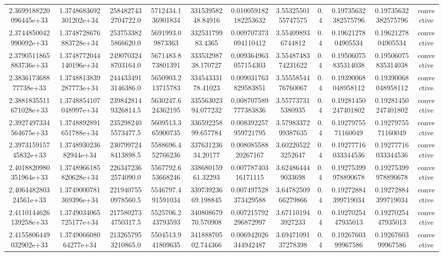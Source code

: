 \begin{table}
\begin{tabular}{ccccccccccc}
2.3699188220096445e+33 & 1.3748683692301202e+34 & 2584827432704722.0 & 5712434.136901834 & 33153958248.84916 & 0.010059182182253632 & 3.5532550155747575 & 0.4 & 0.19735632382575796 & 0.19735632382575796 & convective \\
2.3744850042990092e+33 & 1.3748728676883728e+34 & 2537533825866620.0 & 5691993.09873363 & 33253179983.4365 & 0.009707373094110412 & 3.554098936744812 & 0.4 & 0.1962127804905534 & 0.1962127804905534 & convective \\
2.3790511865883736e+33 & 1.3748772044140196e+34 & 2490703248703164.0 & 5671483.873801391 & 33353298738.170727 & 0.009364963057154303 & 3.5548748374231622 & 0.4 & 0.19506075835314038 & 0.19506075835314038 & convective \\
2.383617368877738e+33 & 1.3748813839287773e+34 & 2444334913146386.0 & 5650903.213715783 & 33454333178.41023 & 0.009031763829583851 & 3.5555854476760067 & 0.4 & 0.19390068048958112 & 0.19390068048958112 & convective \\
2.3881835511671028e+33 & 1.3748854107048997e+34 & 2398428149326814.5 & 5630247.624362195 & 33556302394.077232 & 0.008707589777383836 & 3.557737315380935 & 0.4 & 0.19281450247401802 & 0.19281450247401802 & convective \\
2.3927497334564675e+33 & 1.3748892891651788e+34 & 2352982405573477.5 & 5609513.365900735 & 33659225899.657784 & 0.008392257959721795 & 3.5798337299387635 & 0.4 & 0.1927975571160049 & 0.1927975571160049 & convective \\
2.397315915745832e+33 & 1.374893023682944e+34 & 2307997248413898.5 & 5588696.452766236 & 33763123634.20177 & 0.00808558820267167 & 3.602205223252647 & 0.4 & 0.19277716033344536 & 0.19277716033344536 & convective \\
2.4018820980351964e+33 & 1.3748966185820628e+34 & 2263472362574090.0 & 5567792.653668246 & 33868015961.32293 & 0.00778740316171115 & 3.624864449033698 & 0.4 & 0.19275399978890678 & 0.19275399978890678 & convective \\
2.406448280324561e+33 & 1.3749000781369396e+34 & 2219407550978560.5 & 5546797.491591034 & 33973923669.198845 & 0.007497528373429588 & 3.6478250966279866 & 0.4 & 0.19272884399719034 & 0.19272884399719034 & convective \\
2.4110144626139258e+33 & 1.3749034065725177e+34 & 2175802734750317.5 & 5525706.243793593 & 34080867970.570908 & 0.007215792296872997 & 3.671101943927233 & 0.4 & 0.1927025447935013 & 0.1927025447935013 & convective \\
2.4155806449032902e+33 & 1.374906608064277e+34 & 2132657953210865.0 & 5504513.941809635 & 34188870502.744366 & 0.006942026344942487 & 3.6947109137278398 & 0.4 & 0.1926760399967586 & 0.1926760399967586 & convective \\

\end{tabular}
\end{table}
